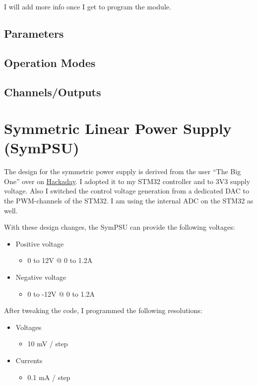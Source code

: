 \vspace{1cm}

I will add more info once I get to program the module. 

\subsection{Parameters}
\subsection{Operation Modes}
\subsection{Channels/Outputs}
\section{Symmetric Linear Power Supply (SymPSU)}
The design for the symmetric power supply is derived from the user ``The Big One'' over on \textcolor{blue}{\href{https://hackaday.io/project/4154-bench-power-supply}{Hackaday}}. I adopted it to my STM32 controller and to 3V3 supply voltage. Also I switched the control voltage generation from a dedicated DAC to the PWM-channels of the STM32. I am using the internal ADC on the STM32 as well. 

With these design changes, the SymPSU can provide the following voltages:
\begin{itemize}
	\item Positive voltage
	\begin{itemize}
		\item 0 to 12V @ 0 to 1.2A
	\end{itemize}
	\item Negative voltage
	\begin{itemize}
		\item 0 to -12V @ 0 to 1.2A
	\end{itemize}
\end{itemize}

After tweaking the code, I programmed the following resolutions:

\begin{itemize}
	\item Voltages
	\begin{itemize}
		\item 10 mV / step
	\end{itemize}
	\item Currents
	\begin{itemize}
		\item 0.1 mA / step
	\end{itemize}
\end{itemize}

